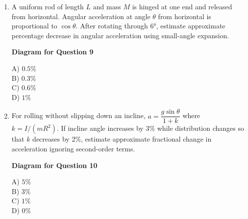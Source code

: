 \documentclass[12pt]{article}
\begin{document}
\begin{enumerate}
A) $+4\%$ \\
B) $+2\%$ \\
C) $-2\%$ \\
D) $-4\%$

\item A uniform rod of length $L$ and mass $M$ is hinged at one end and released from horizontal. Angular acceleration at angle $\theta$ from horizontal is proportional to $\cos\theta$. After rotating through 6°, estimate approximate percentage decrease in angular acceleration using small-angle expansion.

\begin{center}
\textbf{Diagram for Question 9}
\end{center}

A) $0.5\%$ \\
B) $0.3\%$ \\
C) $0.6\%$ \\
D) $1\%$

\item For rolling without slipping down an incline, $a=\dfrac{g\sin\theta}{1+k}$ where $k=I/(mR^2)$. If incline angle increases by 3\% while distribution changes so that $k$ decreases by 2\%, estimate approximate fractional change in acceleration ignoring second-order terms.

\begin{center}
\textbf{Diagram for Question 10}
\end{center}

A) $5\%$ \\
B) $3\%$ \\
C) $1\%$ \\
D) $0\%$


\end{enumerate}
\end{document}
